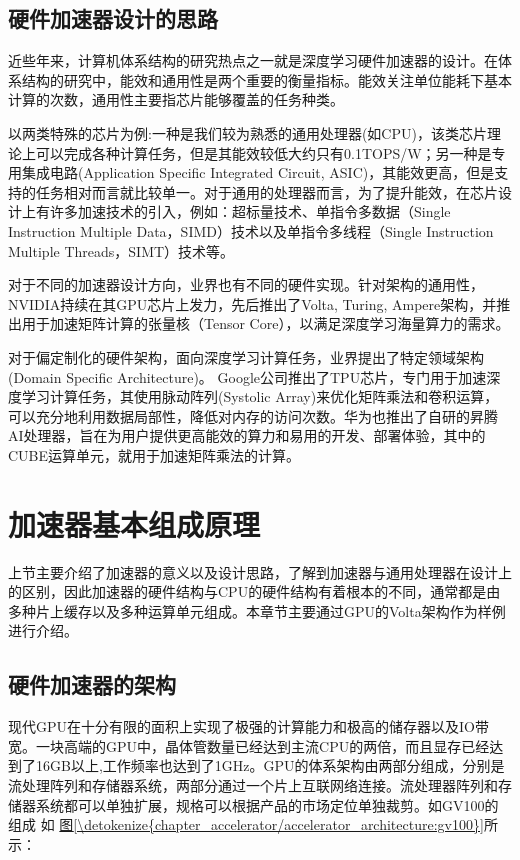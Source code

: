 \documentclass[letterpaper,10pt,english]{sphinxmanual}
\begin{document}
\subsection{硬件加速器设计的思路}
\label{\detokenize{chapter_accelerator/accelerator_introduction:accelerator-design-title}}\label{\detokenize{chapter_accelerator/accelerator_introduction:id3}}
\sphinxAtStartPar
近些年来，计算机体系结构的研究热点之一就是深度学习硬件加速器的设计。在体系结构的研究中，能效和通用性是两个重要的衡量指标。能效关注单位能耗下基本计算的次数，通用性主要指芯片能够覆盖的任务种类。

\sphinxAtStartPar
以两类特殊的芯片为例:一种是我们较为熟悉的通用处理器(如CPU)，该类芯片理论上可以完成各种计算任务，但是其能效较低大约只有0.1TOPS/W；另一种是专用集成电路(Application
Specific Integrated Circuit,
ASIC)，其能效更高，但是支持的任务相对而言就比较单一。对于通用的处理器而言，为了提升能效，在芯片设计上有许多加速技术的引入，例如：超标量技术、单指令多数据（Single
Instruction Multiple Data，SIMD）技术以及单指令多线程（Single
Instruction Multiple Threads，SIMT）技术等。

\sphinxAtStartPar
对于不同的加速器设计方向，业界也有不同的硬件实现。针对架构的通用性，NVIDIA持续在其GPU芯片上发力，先后推出了Volta,
Turing, Ampere架构，并推出用于加速矩阵计算的张量核（Tensor
Core），以满足深度学习海量算力的需求。

\sphinxAtStartPar
对于偏定制化的硬件架构，面向深度学习计算任务，业界提出了特定领域架构(Domain
Specific Architecture)。
Google公司推出了TPU芯片，专门用于加速深度学习计算任务，其使用脉动阵列(Systolic
Array)来优化矩阵乘法和卷积运算，可以充分地利用数据局部性，降低对内存的访问次数。华为也推出了自研的昇腾AI处理器，旨在为用户提供更高能效的算力和易用的开发、部署体验，其中的CUBE运算单元，就用于加速矩阵乘法的计算。


\section{加速器基本组成原理}
\label{\detokenize{chapter_accelerator/accelerator_architecture:id1}}\label{\detokenize{chapter_accelerator/accelerator_architecture::doc}}
\sphinxAtStartPar
上节主要介绍了加速器的意义以及设计思路，了解到加速器与通用处理器在设计上的区别，因此加速器的硬件结构与CPU的硬件结构有着根本的不同，通常都是由多种片上缓存以及多种运算单元组成。本章节主要通过GPU的Volta架构作为样例进行介绍。


\subsection{硬件加速器的架构}
\label{\detokenize{chapter_accelerator/accelerator_architecture:id2}}
\sphinxAtStartPar
现代GPU在十分有限的面积上实现了极强的计算能力和极高的储存器以及IO带宽。一块高端的GPU中，晶体管数量已经达到主流CPU的两倍，而且显存已经达到了16GB以上,工作频率也达到了1GHz。GPU的体系架构由两部分组成，分别是流处理阵列和存储器系统，两部分通过一个片上互联网络连接。流处理器阵列和存储器系统都可以单独扩展，规格可以根据产品的市场定位单独裁剪。如GV100的组成
如 \hyperref[\detokenize{chapter_accelerator/accelerator_architecture:gv100}]{图\ref{\detokenize{chapter_accelerator/accelerator_architecture:gv100}}}所示：
\end{document}
